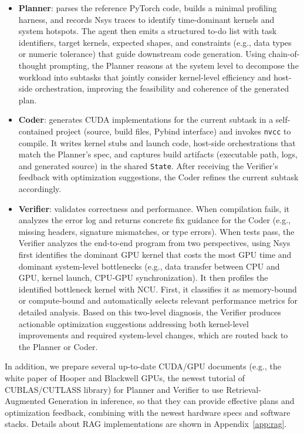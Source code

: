 \vspace{-10pt}
\begin{itemize}
\item \textbf{Planner}: parses the reference PyTorch code, builds a minimal profiling harness, and records Nsys traces to identify time-dominant kernels and system hotspots. The agent then emits a structured to-do list with task identifiers, target kernels, expected shapes, and constraints (e.g., data types or numeric tolerance) that guide downstream code generation. Using chain-of-thought prompting, the Planner reasons at the system level to decompose the workload into subtasks that jointly consider kernel-level efficiency and host-side orchestration, improving the feasibility and coherence of the generated plan.

\item \textbf{Coder}: generates CUDA implementations for the current subtask in a self-contained project (source, build files, Pybind interface) and invokes
\texttt{nvcc} to compile. It writes kernel stubs and launch code, host-side orchestrations that match the Planner's spec, and captures build artifacts (executable path, logs, and generated source) in the shared \texttt{State}. After receiving the Verifier's feedback with optimization suggestions, the Coder refines the current subtask accordingly.

\item \textbf{Verifier}: validates correctness and performance. When compilation fails, it analyzes the error log and returns concrete fix guidance for the Coder (e.g., missing headers, signature mismatches, or type errors). When tests pass, the Verifier analyzes the end-to-end program from two perspectives, using Nsys first identifies the dominant GPU kernel that costs the most GPU time and dominant system-level bottlenecks (e.g., data transfer between CPU and GPU, kernel launch, CPU-GPU synchronization). It then profiles the identified bottleneck kernel with NCU. First, it classifies it as memory-bound or compute-bound and automatically selects relevant performance metrics for detailed analysis. Based on this two-level diagnosis, the Verifier produces actionable optimization suggestions addressing both kernel-level improvements and required system-level changes, which are routed back to the Planner or Coder.
\end{itemize}

In addition, we prepare several up-to-date CUDA/GPU documents (e.g., the white paper of Hooper and Blackwell GPUs, the newest tutorial of CUBLAS/CUTLASS library) for Planner and Verifier to use Retrieval-Augmented Generation \cite{lewis2021retrievalaugmentedgenerationknowledgeintensivenlp} in inference, so that they can provide effective plans and optimization feedback, combining with the newest hardware specs and software stacks. Details about RAG implementations are shown in Appendix~\ref{app:rag}.

